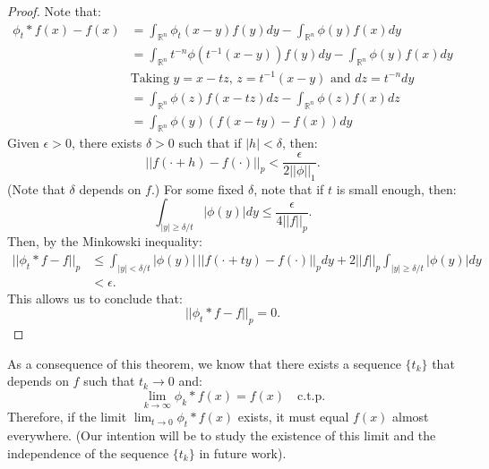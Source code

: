 \begin{proof}{}
  Note that:
  \begin{align*}
    \phi_t*f(x)-f(x)&=\int_{\mathbb{R}^n}\phi_t(x-y)f(y)dy-\int_{\mathbb{R}^n}\phi(y)f(x)dy\\
    &=\int_{\mathbb{R}^n}t^{-n}\phi(t^{-1}(x-y))f(y)dy-\int_{\mathbb{R}^n}\phi(y)f(x)dy\\ 
    &\text{Taking $y=x-tz$, $z=t^{-1}(x-y)$ and $dz=t^{-n}dy$}\\
    &=\int_{\mathbb{R}^n}\phi(z)f(x-tz)dz-\int_{\mathbb{R}^n}\phi(z)f(x)dz\\
    &=\int_{\mathbb{R}^n}\phi(y)(f(x-ty)-f(x))dy
  \end{align*}
  Given $\epsilon>0$, there exists $\delta>0$ such that if $|h|<\delta$, then:
  $$||f(\cdot+h)-f(\cdot)||_p<\frac{\epsilon}{2||\phi||_1}.$$
  (Note that $\delta$ depends on $f$.) For some fixed $\delta$, note that if $t$ is small enough, then:
  $$\int_{|y|\geq \delta/t}|\phi(y)|dy\leq \frac{\epsilon}{4||f||_p}.$$
  Then, by the Minkowski inequality:
  \begin{align*}
    ||\phi_t*f-f||_p&\leq\int_{|y|<\delta/t}|\phi(y)| \,||f(\cdot+ty)-f( \cdot)||_pdy+2||f||_p\int_{|y|\geq \delta/t}|\phi(y)|dy\\
    &< \epsilon.
  \end{align*}
  This allows us to conclude that:
  $$||\phi_t*f-f||_p=0.$$  
\end{proof}
\begin{note}{}
  As a consequence of this theorem, we know that there exists a sequence $\{t_k\}$ that depends on $f$ such that $t_k\rightarrow 0$ and:
  $$\lim_{k\rightarrow \infty}\phi_k*f(x)=f(x) \quad \text{c.t.p.}$$
  Therefore, if the limit $\lim_{t\to 0} \phi_t*f(x)$ exists, it must equal $f(x)$ almost everywhere. (Our intention will be to study the existence of this limit and the independence of the sequence $\{t_k\}$ in future work).  
\end{note}
